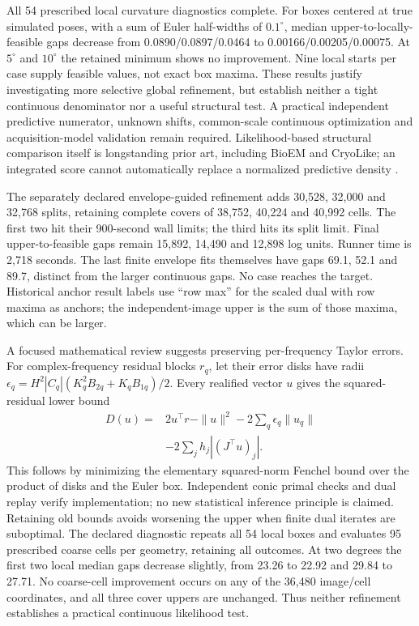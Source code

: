 All 54 prescribed local curvature diagnostics complete. For boxes centered
at true simulated poses, with a sum of Euler half-widths of $0.1^\circ$,
median upper-to-locally-feasible gaps decrease from 0.0890/0.0897/0.0464 to
0.00166/0.00205/0.00075. At $5^\circ$ and $10^\circ$ the retained minimum shows
no improvement. Nine local starts per case supply feasible values, not exact
box maxima. These results justify investigating more selective global
refinement, but establish neither a tight continuous denominator nor a useful
structural test. A practical independent predictive numerator, unknown shifts,
common-scale continuous optimization and acquisition-model validation remain
required. Likelihood-based structural comparison itself is longstanding prior
art, including BioEM and CryoLike; an integrated score cannot automatically
replace a normalized predictive density \citep{bioem2013,cryolike2025}.


The separately declared envelope-guided refinement adds 30,528, 32,000 and
32,768 splits, retaining complete covers of 38,752, 40,224 and 40,992 cells.
The first two hit their 900-second wall limits; the third hits its split limit.
Final upper-to-feasible gaps remain 15,892, 14,490 and 12,898 log units.
Runner time is 2,718 seconds. The last finite envelope fits themselves have
gaps 69.1, 52.1 and 89.7, distinct from the larger continuous gaps. No case
reaches the target. Historical anchor result labels use ``row max'' for the
scaled dual with row maxima as anchors; the independent-image upper is the
sum of those maxima, which can be larger.

A focused mathematical review suggests preserving per-frequency Taylor errors.
For complex-frequency residual blocks $r_q$, let their error disks have radii
$\epsilon_q=H^2|C_q|(K_q^2 B_{2q}+K_qB_{1q})/2$. Every realified vector $u$
gives the squared-residual lower bound
\begin{align*}
 D(u)={}&2u^\top r-\|u\|^2-2\sum_q\epsilon_q\|u_q\|\\
 &-2\sum_jh_j|(J^\top u)_j|.
\end{align*}
This follows by minimizing the elementary squared-norm Fenchel bound over
the product of disks and the Euler box. Independent conic primal checks and
dual replay verify implementation; no new statistical inference principle is
claimed. Retaining old bounds avoids worsening the upper when finite dual
iterates are suboptimal. The declared diagnostic repeats all 54 local boxes
and evaluates 95 prescribed coarse cells per geometry, retaining all outcomes.
At two degrees the first two local median gaps decrease slightly, from 23.26
to 22.92 and 29.84 to 27.71. No coarse-cell improvement occurs on any of the
36,480 image/cell coordinates, and all three cover uppers are unchanged.
Thus neither refinement establishes a practical continuous likelihood test.
